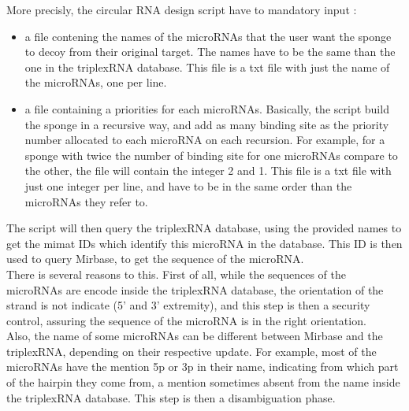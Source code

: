 \documentclass[a4paper,12pt]{report}
\begin{document}
More precisly, the circular RNA design script have to mandatory input :
\begin{itemize}
	\item a file  contening the names of the microRNAs that the user want the sponge to decoy from their original target. The names have to be the same than the one in the triplexRNA database. This file is a txt file with just the name of the microRNAs, one per line.
	\item a file containing a priorities for each microRNAs. Basically, the script build the sponge in a recursive way, and add as many binding site as the priority number allocated to each microRNA on each recursion. For example, for a sponge with twice the number of binding site for one microRNAs compare to the other, the file will contain the integer 2 and 1. This file is a txt file with just one integer per line, and have to be in the same order than the microRNAs they refer to.
	
\end{itemize}

The script will then query the triplexRNA database, using the provided names to get the mimat IDs which identify this microRNA in the database. This ID is then used to query Mirbase, to get the sequence of the microRNA. \\

There is several reasons to this. First of all, while the sequences of the microRNAs are encode inside the triplexRNA database, the orientation of the strand is not indicate (5' and 3' extremity), and this step is then a security control, assuring the sequence of the microRNA is in the right orientation.\\

Also, the name of some microRNAs can be different between Mirbase and the triplexRNA, depending on their respective update. For example, most of the microRNAs have the mention 5p or 3p in their name, indicating from which part of the hairpin they come from, a mention sometimes absent from the name inside the triplexRNA database. This step is then a disambiguation phase. 
\end{document}
